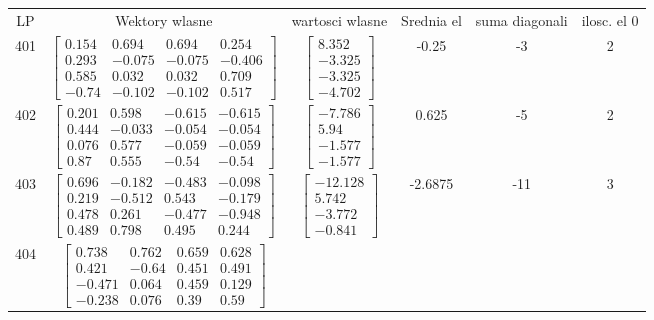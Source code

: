 \documentclass[a4paper,12pt]{article}
\begin{document}
\bgroup {} \vspace{0.2in} \begin{tabular}{c c c c c c}
LP &Wektory wlasne & wartosci wlasne & Srednia el & suma diagonali & ilosc. el 0\\
401
&
$\begin{bmatrix} 0.154 & 0.694 & 0.694 & 0.254 \\ 0.293 & -0.075 & -0.075 & -0.406 \\ 0.585 & 0.032 & 0.032 & 0.709 \\ -0.74 & -0.102 & -0.102 & 0.517 \end{bmatrix}$
&
$\begin{bmatrix} 8.352 \\ -3.325 \\ -3.325 \\ -4.702 \end{bmatrix}$
&
-0.25
&
-3
&
2
\\
402
&
$\begin{bmatrix} 0.201 & 0.598 & -0.615 & -0.615 \\ 0.444 & -0.033 & -0.054 & -0.054 \\ 0.076 & 0.577 & -0.059 & -0.059 \\ 0.87 & 0.555 & -0.54 & -0.54 \end{bmatrix}$
&
$\begin{bmatrix} -7.786 \\ 5.94 \\ -1.577 \\ -1.577 \end{bmatrix}$
&
0.625
&
-5
&
2
\\
403
&
$\begin{bmatrix} 0.696 & -0.182 & -0.483 & -0.098 \\ 0.219 & -0.512 & 0.543 & -0.179 \\ 0.478 & 0.261 & -0.477 & -0.948 \\ 0.489 & 0.798 & 0.495 & 0.244 \end{bmatrix}$
&
$\begin{bmatrix} -12.128 \\ 5.742 \\ -3.772 \\ -0.841 \end{bmatrix}$
&
-2.6875
&
-11
&
3
\\
404
&
$\begin{bmatrix} 0.738 & 0.762 & 0.659 & 0.628 \\ 0.421 & -0.64 & 0.451 & 0.491 \\ -0.471 & 0.064 & 0.459 & 0.129 \\ -0.238 & 0.076 & 0.39 & 0.59 \end{bmatrix}$

\end{tabular}
\end{document}
